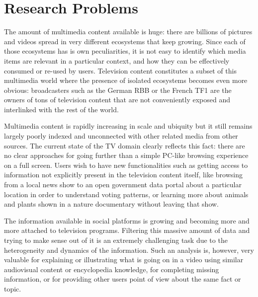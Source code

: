 \documentclass[a4paper,11pt]{report}
\begin{document}
\chapter*{Research Problems}

The amount of multimedia content available is huge: there are billions of pictures and videos spread in very different ecosystems that keep growing. Since each of those ecosystems has is own peculiarities, it is not easy to identify which media items are relevant in a particular context, and how they can be effectively consumed or re-used by users. Television content constitutes a subset of this multimedia world where the presence of isolated ecosystems becomes even more obvious: broadcasters such as the German RBB or the French TF1 are the owners of tons of television content that are not conveniently exposed and interlinked with the rest of the world.

Multimedia content is rapidly increasing in scale and ubiquity but it still remains largely poorly indexed and unconnected with other related media from other sources. The current state of the TV domain clearly reflects this fact: there are no clear approaches for going further than a simple PC-like browsing experience on a full screen. Users wish to have new functionalities such as getting access to information not explicitly present in the television content itself, like browsing from a local news show to an open government data portal about a particular location in order to understand voting patterns, or learning more about animals and plants shown in a nature documentary without leaving that show.

The information available in social platforms is growing and becoming more and more attached to television programs. Filtering this massive amount of data and trying to make sense out of it is an extremely challenging task due to the heterogeneity and dynamics of the information. Such an analysis is, however, very valuable for explaining or illustrating what is going on in a video using similar audiovisual content or encyclopedia knowledge, for completing missing information, or for providing other users point of view about the same fact or topic.
\end{document}
